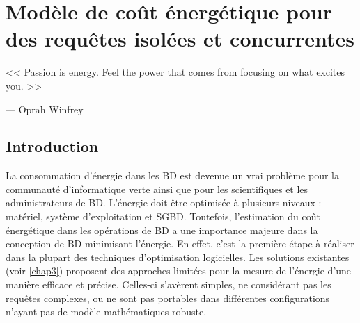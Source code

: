 \chapter{Modèle de coût énergétique pour des requêtes isolées et concurrentes}
\label{chap4}

\epigraph{<< Passion is energy. Feel the power that comes from focusing on what excites you. >>}{--- \textup{Oprah Winfrey}}

\NoChapterPrefix \NoChapterNumberInRef {\hypersetup{linkcolor=black} \minitoc}

\makeatletter
\renewcommand{\thefigure}{\ifnum \c@section>\z@ \thechapter.\fi
 \@arabic\c@figure}
\makeatother

\makeatletter
\renewcommand{\thetable}{\ifnum \c@section>\z@ \thechapter.\fi
 \@arabic\c@table}
\makeatother

\makeatletter
\renewcommand{\theequation}{\ifnum \c@section>\z@ \thechapter.\fi
 \@arabic\c@equation}
\makeatother


\newpage

\section{Introduction}

La consommation d'énergie dans les BD est devenue un vrai problème pour la communauté d'informatique verte ainsi que pour les scientifiques et les administrateurs de BD. L'énergie doit être optimisée à plusieurs niveaux : matériel, système d'exploitation et SGBD. Toutefois, l'estimation du coût énergétique dans les opérations de BD a une importance majeure dans la conception de BD minimisant l'énergie. En effet, c'est la première étape à réaliser dans la plupart des techniques d'optimisation logicielles. Les solutions existantes (voir \ref{chap3}) proposent des approches limitées pour la mesure de l'énergie d'une manière efficace et précise. Celles-ci s'avèrent simples, ne considérant pas les requêtes complexes, ou ne sont pas portables dans différentes configurations n'ayant pas de modèle mathématiques robuste.

